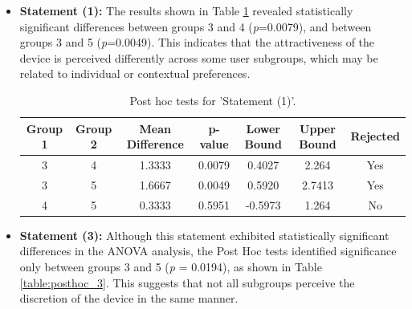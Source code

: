                 \begin{itemize}
                    \item \textbf{Statement (1):} The results shown in Table \ref{table:posthoc_1} revealed statistically significant differences between groups 3 and 4 (\textit{p}=0.0079), and between groups 3 and 5 (\textit{p}=0.0049). This indicates that the attractiveness of the device is perceived differently across some user subgroups, which may be related to individual or contextual preferences.
                    
                    \begin{table}[h]
                        \centering
                        \caption{Post hoc tests for 'Statement (1)'.}
                        \footnotesize\setlength{\tabcolsep}{3pt}\begin{tabularx}{\linewidth}{ccccccc}
                            \hline
                            \textbf{Group 1} & \textbf{Group 2} & \textbf{Mean Difference} & \textbf{p-value} & \textbf{Lower Bound} & \textbf{Upper Bound} & \textbf{Rejected} \\
                            \hline
                            3 & 4 & 1.3333 & 0.0079 & 0.4027 & 2.264 & Yes \\
                            3 & 5 & 1.6667 & 0.0049 & 0.5920 & 2.7413 & Yes \\
                            4 & 5 & 0.3333 & 0.5951 & -0.5973 & 1.264 & No \\
                            \hline
                        \end{tabularx}
                        \label{table:posthoc_1}
                    \end{table}
                    
                    \item \textbf{Statement (3):} Although this statement exhibited statistically significant differences in the ANOVA analysis, the Post Hoc tests identified significance only between groups 3 and 5 (\textit{p} = 0.0194), as shown in Table \ref{table:posthoc_3}. This suggests that not all subgroups perceive the discretion of the device in the same manner.
                    

\end{itemize}
